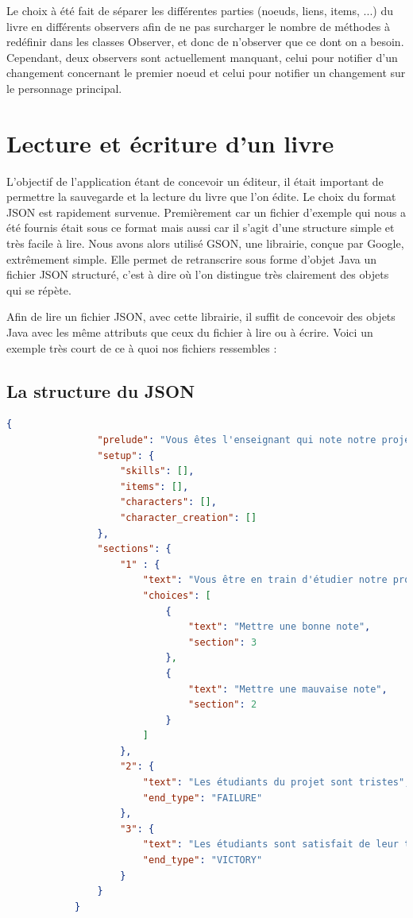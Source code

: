 			Le choix à été fait de séparer les différentes parties (noeuds, liens, items, ...) du livre en différents observers afin de ne pas surcharger le nombre de méthodes à redéfinir dans les classes Observer, et donc de n'observer que ce dont on a besoin. Cependant, deux observers sont actuellement manquant, celui pour notifier d'un changement concernant le premier noeud et celui pour notifier un changement sur le personnage principal.

	\section{Lecture et écriture d'un livre}\label{sec:Json}

		L'objectif de l'application étant de concevoir un éditeur, il était important de permettre la sauvegarde et la lecture du livre que l'on édite. Le choix du format JSON est rapidement survenue. Premièrement car un fichier d'exemple qui nous a été fournis était sous ce format mais aussi car il s'agit d'une structure simple et très facile à lire. Nous avons alors utilisé GSON, une librairie, conçue par Google, extrêmement simple. Elle permet de retranscrire sous forme d'objet Java un fichier JSON structuré, c'est à dire où l'on distingue très clairement des objets qui se répète.

		Afin de lire un fichier JSON, avec cette librairie, il suffit de concevoir des objets Java avec les même attributs que ceux du fichier à lire ou à écrire. Voici un exemple très court de ce à quoi nos fichiers ressembles :

		\subsection{La structure du JSON}

			\begin{lstlisting}[gobble=12, language=json, caption=Exemple de livre très simple, label=lst:exemple_livre]
			{
				"prelude": "Vous êtes l'enseignant qui note notre projet",
				"setup": {
					"skills": [],
					"items": [],
					"characters": [],
					"character_creation": []
				},
				"sections": {
					"1" : {
						"text": "Vous être en train d'étudier notre projet",
						"choices": [
							{
								"text": "Mettre une bonne note",
								"section": 3
							},
							{
								"text": "Mettre une mauvaise note",
								"section": 2
							}
						]
					},
					"2": {
						"text": "Les étudiants du projet sont tristes",
						"end_type": "FAILURE"
					},
					"3": {
						"text": "Les étudiants sont satisfait de leur travail",
						"end_type": "VICTORY"
					}
				}
			}
			\end{lstlisting}

